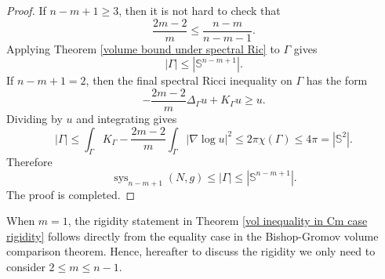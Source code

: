 \documentclass[11pt]{amsart}
\theoremstyle{definition}
\theoremstyle{remark}
\numberwithin{equation}{section}
\begin{document}
\begin{proof}
    If $n-m+1\geq 3$, then it is not hard to check that 
    \begin{equation}\label{condition 1}
        \frac{2m-2}{m}\leq \frac{n-m}{n-m-1}.
    \end{equation}
    Applying Theorem \ref{volume bound under spectral Ric} to $\Gamma$ gives
    \[
        |\Gamma|\leq  |\mathbb{S}^{n-m+1}|.
    \]
    If $n-m+1=2$, then the final spectral Ricci inequality on $\Gamma$ has the form
    \[
        -\frac{2m-2}{m}\Delta_{\Gamma}u+K_{\Gamma}u\geq u.
    \]
    Dividing by $u$ and integrating gives
    \[
        |\Gamma|\leq \int_{\Gamma}K_{\Gamma}
          -\frac{2m-2}{m}\int_{\Gamma}|\nabla\log u|^2
        \leq 2\pi\chi(\Gamma)\leq 4\pi=|\mathbb{S}^2|.
    \]
    Therefore
    \[
    \operatorname{sys}_{n-m+1}(N,g)\leq |\Gamma|\leq |\mathbb{S}^{n-m+1}|.
    \]
    The proof is completed.
    \end{proof}

When $m=1$, the rigidity statement in Theorem \ref{vol inequality in Cm case rigidity} follows
  directly from the equality case in the Bishop-Gromov volume comparison theorem. Hence, hereafter to discuss the
  rigidity we only need to consider $2\leq m\leq n-1$.
\end{document}
